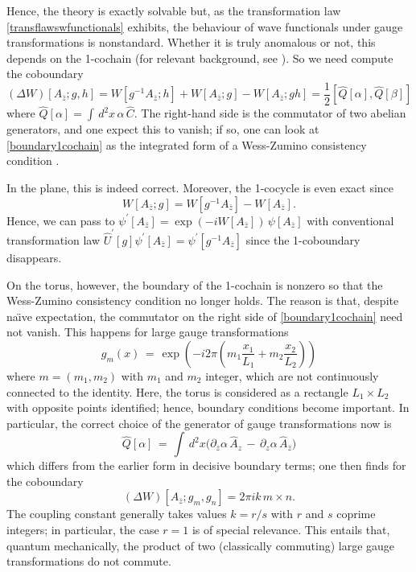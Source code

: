 \documentclass[a4paper,10pt]{article}
\begin{document}
Hence, the theory is exactly solvable but, as the transformation law 
\eqref{transflawswfunctionals} exhibits, the behaviour of wave functionals under gauge 
transformations is nonstandard. Whether it is truly anomalous or not, this depends on the 
1-cochain (for relevant background, see \cite{Kost 87,Jack 88}). So we need compute the 
coboundary 
\begin{equation}\label{boundary1cochain}
(\Delta W)[A_{\bar{z}};g,h]=W[g^{-1}A_{\bar{z}};h]+W[A_{\bar{z}};g]-
W[A_{\bar{z}};gh]=\frac{1}{2}[\hat{Q}[\alpha],\hat{Q}[\beta]]
\end{equation}
where $\hat{Q}[\alpha]=\int\,d^2x\,\alpha\,\hat{C}$. The right-hand side is the 
commutator of two abelian generators, and one expect this to vanish; if so, one can look 
at \eqref{boundary1cochain} as the integrated form of a Wess-Zumino consistency condition 
\cite{Wess 71}. 

In the plane, this is indeed correct. Moreover, the 1-cocycle is even exact since
\begin{equation}
W[A_{\bar{z}};g]=W[g^{-1}A_{\bar{z}}]-W[A_{\bar{z}}].
\end{equation}
Hence, we can pass to $ \psi^{\prime}[A_{\bar{z}}]=\exp\left(-
iW[A_{\bar{z}}]\right)\,\psi[A_{\bar{z}}]$ with conventional transformation law 
$\hat{U}^{\prime}[g]\psi^{\prime}[A_{\bar{z}}]=
\psi^{\prime}[g^{-1}A_{\bar{z}}]$ since the 1-coboundary disappears.

On the torus, however, the boundary of the 1-cochain is nonzero so that the Wess-Zumino 
consistency condition no longer holds. The reason is that, despite 
na\"\i ve expectation, the commutator on the right side of \eqref{boundary1cochain} 
need not vanish. This happens for large gauge transformations 
\begin{equation}g_m(x)\,=\,\exp\left(-i2\pi(m_1\frac{x_1}{L_1}+m_2\frac{x_2}{L_2})\right)
\end{equation}
where $m=(m_1,m_2)$ with $m_1$ and $m_2$ integer, which are not continuously connected to 
the identity. Here, the torus is considered as a rectangle $L_1\times L_2$ with opposite 
points identified; hence, boundary conditions become important. In particular, the 
correct choice of the generator of gauge transformations now is
\begin{equation}
\hat{Q}[\alpha]\,=\,\int\,d^2x\big(\partial_{\bar{z}}\alpha\,\hat{A}_z\,-
\,\partial_z\alpha\,\hat{A}_{\bar{z}}\big)
\end{equation}
which differs from the earlier form in decisive boundary terms; one then finds for the 
coboundary
\begin{equation}
(\Delta W)[A_{\bar{z}};g_m,g_n]=2\pi ik\,m\times n.
\end{equation}
The coupling constant generally takes values $k=r/s$ with $r$ and $s$ coprime integers;  
in particular, the case $r=1$ is of special relevance. This entails that, quantum 
mechanically, the product of two (classically commuting) large gauge transformations do 
not commute.
\end{document}
